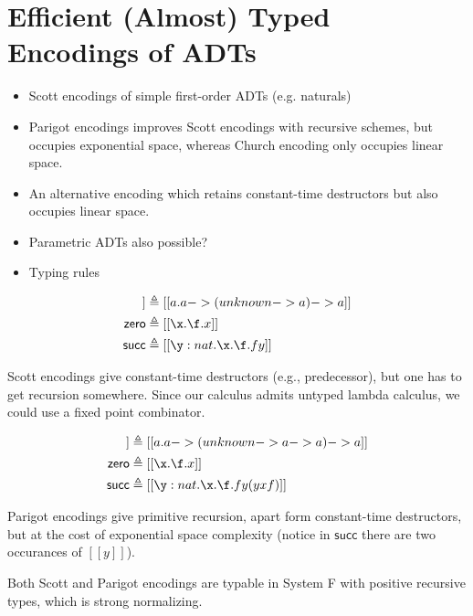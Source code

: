 \section{Efficient (Almost) Typed Encodings of ADTs}


\begin{itemize}
\item Scott encodings of simple first-order ADTs (e.g. naturals)
\item Parigot encodings improves Scott encodings with recursive schemes, but
  occupies exponential space, whereas Church encoding only occupies linear
  space.
\item An alternative encoding which retains constant-time destructors but also
  occupies linear space.
\item Parametric ADTs also possible?
\item Typing rules
\end{itemize}

\begin{example}
\begin{align*}
  [[nat]] &\triangleq [[  \/a. a -> (unknown -> a) -> a ]] \\
  \mathsf{zero} &\triangleq [[ \x . \f . x  ]] \\
  \mathsf{succ} &\triangleq [[ \y : nat . \x . \f . f y ]]
\end{align*}
\end{example}
Scott encodings give constant-time destructors (e.g., predecessor), but one has to
get recursion somewhere. Since our calculus admits untyped lambda calculus, we
could use a fixed point combinator.

\begin{example}
\begin{align*}
  [[nat]] &\triangleq [[  \/a. a -> (unknown -> a -> a) -> a ]] \\
  \mathsf{zero} &\triangleq [[ \x . \f . x  ]] \\
  \mathsf{succ} &\triangleq [[ \y : nat . \x . \f . f y (y x f) ]]
\end{align*}
\end{example}
Parigot encodings give primitive recursion, apart form constant-time
destructors, but at the cost of exponential space complexity (notice in
$\mathsf{succ}$ there are two occurances of $[[y]]$).

Both Scott and Parigot encodings are typable in System F with positive recursive
types, which is strong normalizing.

